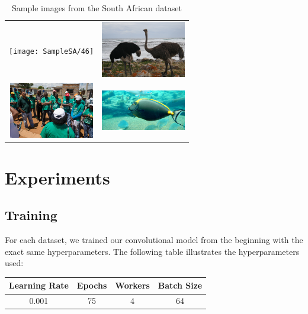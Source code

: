 \documentclass[conference]{IEEEtran}
\begin{document}
\begin{table}[h!]
\centering
\begin{tabular}{cc}
\texttt{[image: SampleSA/46]} & \includegraphics[width=3.7cm]{SampleSA/61}\\
\includegraphics[width=3.7cm]{SampleSA/106} & \includegraphics[width=3.7cm]{SampleSA/127}\\

\end{tabular}
\caption{Sample images from the South African dataset}
\label{fig:samplesa}
\end{table}

\section{Experiments}

%
%
%
%
%

\subsection{Training}

For each dataset, we trained our convolutional model from the beginning with the exact same hyperparameters. The following table illustrates the hyperparameters used:


\begin{table}[h]
\centering
\renewcommand{\arraystretch}{1.5}
\begin{tabular}{|c|c|c|c|}
\hline 
Learning Rate & Epochs & Workers & Batch Size \\ 
\hline 
0.001 & 75 & 4 & 64 \\ 
\hline 
\end{tabular} 
\end{table}
\end{document}
